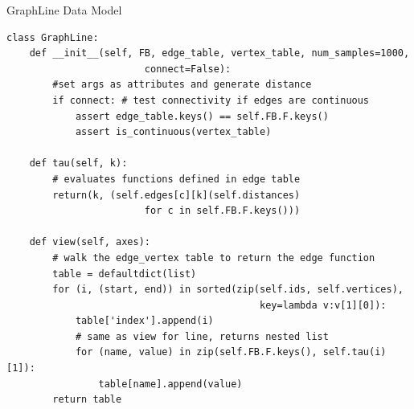 \documentclass[xcolor={dvipsnames}, handout]{beamer}
\begin{document}
\begin{frame}[fragile]{GraphLine Data Model}
\begin{verbatim}
class GraphLine:
    def __init__(self, FB, edge_table, vertex_table, num_samples=1000,
                        connect=False):
        #set args as attributes and generate distance
        if connect: # test connectivity if edges are continuous
            assert edge_table.keys() == self.FB.F.keys()
            assert is_continuous(vertex_table)

    def tau(self, k):
        # evaluates functions defined in edge table
        return(k, (self.edges[c][k](self.distances) 
                        for c in self.FB.F.keys()))

    def view(self, axes):
        # walk the edge_vertex table to return the edge function
        table = defaultdict(list)
        for (i, (start, end)) in sorted(zip(self.ids, self.vertices), 
                                            key=lambda v:v[1][0]):
            table['index'].append(i)
            # same as view for line, returns nested list
            for (name, value) in zip(self.FB.F.keys(), self.tau(i)[1]):
                table[name].append(value)
        return table
\end{verbatim}
\end{frame}
\end{document}
